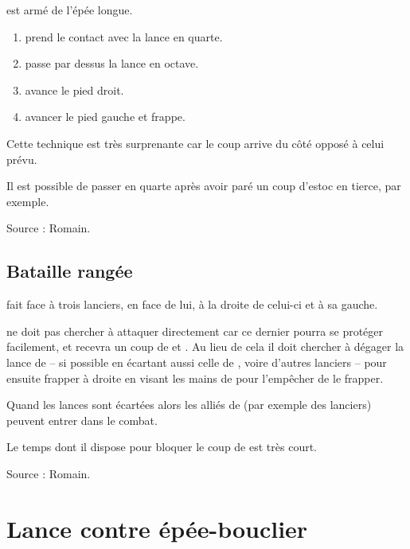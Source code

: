 \begin{technique}

\A est armé de l'épée longue.

\begin{enumerate}
	\item \A prend le contact avec la lance en quarte.
	
	\item \A passe par dessus la lance en octave.
	
	\item \A avance le pied droit.
	
	\item \A avancer le pied gauche et frappe.
\end{enumerate}

Cette technique est très surprenante car le coup arrive du côté opposé à celui prévu.

Il est possible de passer en quarte après avoir paré un coup d'estoc en tierce, par exemple.

Source : Romain.
\end{technique}


\subsection{Bataille rangée}


\begin{technique}

\A fait face à trois lanciers,  en face de lui,  à la droite de celui-ci et  à sa gauche.

\A ne doit pas chercher à attaquer directement  car ce dernier pourra se protéger facilement, et \A recevra un coup de  et .
Au lieu de cela il doit chercher à dégager la lance de  – si possible en écartant aussi celle de , voire d'autres lanciers – pour ensuite frapper à droite en visant les mains de  pour l'empêcher de le frapper.

Quand les lances sont écartées alors les alliés de \A (par exemple des lanciers) peuvent entrer dans le combat.

Le temps dont il dispose pour bloquer le coup de  est très court.

Source : Romain.
\end{technique}



\section{Lance contre épée-bouclier}

